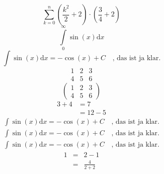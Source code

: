 \documentclass{article}
\newcommand{\rund}[1]{\left(#1\right)}
\newcommand{\intd}[1]{\text{d}#1}
\begin{document}
\begin{equation}
	\sum_{k=0}^{n}\left(\frac{k^2}{2}+2\right)\cdot\rund{\frac{3}{4}+2}
\end{equation}
\begin{equation}
	\int\limits_{0}^{\infty}\sin\rund{x}\intd{x}
\end{equation}
\begin{equation}
	\int\sin\rund{x}\intd{x}=-\cos\rund{x}+C\quad\text{, das ist ja klar.}
\end{equation}
\begin{equation}
	\begin{matrix}
		1 & 2 & 3 \\
		4 & 5 & 6
	\end{matrix}\nonumber
\end{equation}
\begin{equation*}
	\begin{pmatrix}
		1 & 2 & 3 \\
		4 & 5 & 6
	\end{pmatrix}
\end{equation*}
\begin{equation}
\begin{split}
	3 + 4 & = 7 \\
	& = 12 - 5
\end{split}
\end{equation}
\begin{multline}
\int\sin\rund{x}\intd{x}=-\cos\rund{x}+C\quad\text{, das ist ja klar.}\\
\int\sin\rund{x}\intd{x}=-\cos\rund{x}+C\quad\text{, das ist ja klar.}\\
\int\sin\rund{x}\intd{x}=-\cos\rund{x}+C\quad\text{, das ist ja klar.}
\end{multline}
\begin{eqnarray}
	1 & = & 2-1 \nonumber \\
	  & = & \frac{4}{2+2}
\end{eqnarray}
\end{document}

